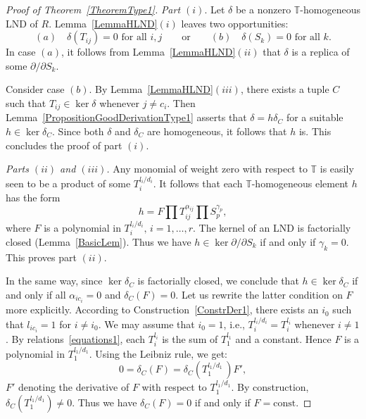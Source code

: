 \documentclass[a4paper,reqno,12pt]{amsart}
\theoremstyle{plain}
\theoremstyle{definition}
\theoremstyle{plain}
\theoremstyle{remark}
\newcommand{\TT}{\mathbb{T}}
\begin{document}
\begin{proof}[Proof of Theorem~\ref{TheoremType1}]
    \emph{Part $(i)$}. Let $\delta$ be a nonzero $\mathbb T$-homogeneous LND of $R$. Lemma~\ref{LemmaHLND}$(i)$ leaves two opportunities: 
    \begin{equation*}
        (a)\quad\delta(T_{ij})=0 \mbox{ for all $i,j$}\qquad\mbox{or} \qquad(b)\quad\delta(S_k)=0 \mbox{  for all $k$.}
    \end{equation*}
    In case $(a)$, it follows from Lemma~\ref{LemmaHLND}$(ii)$ that $\delta$ is a replica of some $\partial/\partial S_k$. 
    
    Consider case $(b)$. By Lemma~\ref{LemmaHLND}$(iii)$, there exists a tuple $C$ such that $T_{ij}\in\ker\delta$ whenever $j\neq c_i$. Then Lemma~\ref{PropositionGoodDerivationType1} asserts that $\delta=h\delta_C$ for a suitable $h\in\ker\delta_C$. Since both $\delta$ and $\delta_C$ are homogeneous, it follows that $h$ is. This concludes the proof of part $(i)$.

    \emph{Parts $(ii)$ and $(iii)$.} Any monomial of weight zero with respect to ${\TT}$ is easily seen to be a product of some $T_{i}^{l_{i}/d_i}$. It follows that each ${\TT}$-homogeneous element $h$ has the form $$h=F\prod T_{ij}^{\alpha_{ij}}\prod S_p^{\gamma_p},$$ where $F$ is a polynomial in $T_{i}^{l_{i}/d_i}, \,i=1,\ldots,r$. The kernel of an LND is factorially closed (Lemma~\ref{BasicLem}). Thus we have $h\in\ker{\partial/\partial S_k}$ if and only if $\gamma_k=0$. This proves part $(ii)$.

    In the same way, since $\ker\delta_C$ is factorially closed, we conclude that $h\in\ker\delta_C$ if and only if all $\alpha_{ic_i}=0$ and $\delta_C(F)=0$. Let us rewrite the latter condition on $F$ more explicitly. According to Construction~\ref{ConstrDer1}, there exists an $i_0$ such that $l_{ic_i}=1$ for $i\neq i_0$. We may assume that $i_0=1$, i.e., $T_{i}^{l_{i}/d_i}=T_i^{l_i}$ whenever $i\neq 1$. By relations~\eqref{equations1}, each $T_{i}^{l_i}$ is the sum of $T_{1}^{l_{1}}$ and a constant. Hence $F$ is a polynomial in $T_{1}^{l_{1}/d_1}$. Using the Leibniz rule, we get:
    $$
    0=\delta_C(F) = \delta_C\left(T_{1}^{l_{1}/d_1}\,\right) F',
    $$
    $F'$ denoting the derivative of $F$ with respect to $T_{1}^{l_{1}/d_1}$. By construction, $\delta_C(T_{1}^{l_{1}/d_1})\neq0$. Thus we have $\delta_C(F)=0$ if and only if $F=\mathrm{const}$.
\end{proof}
\end{document}
